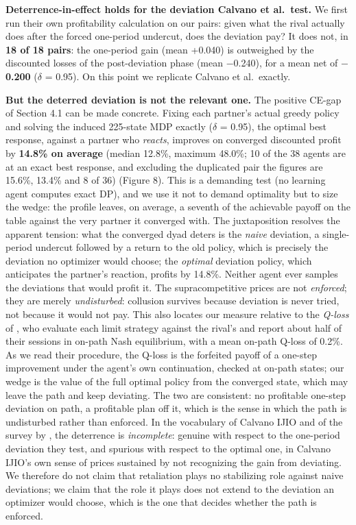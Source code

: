 \documentclass[sigconf]{acmart}
\begin{document}
\textbf{Deterrence-in-effect holds for the deviation Calvano et
al.~test.} We first run their own profitability calculation on our
pairs: given what the rival actually does after the forced one-period
undercut, does the deviation pay? It does not, in \textbf{18 of 18
pairs}: the one-period gain (mean +0.040) is outweighed by the
discounted losses of the post-deviation phase (mean
\ensuremath{-}0.240), for a mean net of \textbf{\ensuremath{-}0.200}
(\ensuremath{\delta} = 0.95). On this point we replicate Calvano et
al.~exactly.

\textbf{But the deterred deviation is not the relevant one.} The
positive CE-gap of Section 4.1 can be made concrete. Fixing each
partner's actual greedy policy and solving the induced 225-state MDP
exactly (\ensuremath{\delta} = 0.95), the optimal best response, against
a partner who \emph{reacts}, improves on converged discounted profit by
\textbf{14.8\% on average} (median 12.8\%, maximum 48.0\%; 10 of the 38
agents are at an exact best response, and excluding the duplicated pair
the figures are 15.6\%, 13.4\% and 8 of 36) (Figure 8). This is a
demanding test (no learning agent computes exact DP), and we use it not
to demand optimality but to size the wedge: the profile leaves, on
average, a seventh of the achievable payoff on the table against the
very partner it converged with. The juxtaposition resolves the apparent
tension: what the converged dyad deters is the \emph{naive} deviation, a
single-period undercut followed by a return to the old policy, which is
precisely the deviation no optimizer would choose; the \emph{optimal}
deviation policy, which anticipates the partner's reaction, profits by
14.8\%. Neither agent ever samples the deviations that would profit it.
The supracompetitive prices are not \emph{enforced}; they are merely
\emph{undisturbed}: collusion survives because deviation is never tried,
not because it would not pay. This also locates our measure relative to
the \emph{Q-loss} of \citet[Section III.D]{calvano2020}, who evaluate
each limit strategy against the rival's and report about half of their
sessions in on-path Nash equilibrium, with a mean on-path Q-loss of
0.2\%. As we read their procedure, the Q-loss is the forfeited payoff of
a one-step improvement under the agent's own continuation, checked at
on-path states; our wedge is the value of the full optimal policy from
the converged state, which may leave the path and keep deviating. The
two are consistent: no profitable one-step deviation on path, a
profitable plan off it, which is the sense in which the path is
undisturbed rather than enforced. In the vocabulary of Calvano IJIO and
of the survey by \citet{tang2024}, the deterrence is \emph{incomplete}:
genuine with respect to the one-period deviation they test, and spurious
with respect to the optimal one, in Calvano IJIO's own sense of prices
sustained by not recognizing the gain from deviating. We therefore do
not claim that retaliation plays no stabilizing role against naive
deviations; we claim that the role it plays does not extend to the
deviation an optimizer would choose, which is the one that decides
whether the path is enforced.
\end{document}
